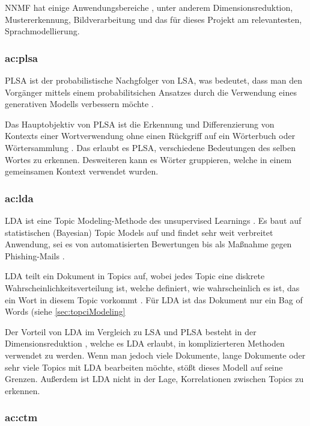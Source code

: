 NNMF hat einige Anwendungsbereiche \cite[4]{Kherwa2020}, unter anderem Dimensionsreduktion, Mustererkennung, Bildverarbeitung und das für dieses Projekt am relevantesten, Sprachmodellierung.

\subsubsection{\acrfull{ac:plsa}}

PLSA ist der probabilistische Nachgfolger von LSA, was bedeutet, dass man den Vorgänger mittels einem probabilitsichen Ansatzes durch die Verwendung eines generativen Modells verbessern möchte \cite[148]{Alghamdi2015}.

Das Hauptobjektiv von PLSA ist die Erkennung und Differenzierung von Kontexts einer Wortverwendung ohne einen Rückgriff auf ein Wörterbuch oder Wörtersammlung \cite[148]{Alghamdi2015}. Das erlaubt es PLSA, verschiedene Bedeutungen des selben Wortes zu erkennen. Desweiteren kann es Wörter gruppieren, welche in einem gemeinsamen Kontext verwendet wurden.

\subsubsection{\acrfull{ac:lda}}

LDA ist eine Topic Modeling-Methode des unsupervised Learnings \cite[149]{Alghamdi2015}. Es baut auf statistischen (Bayesian) Topic Models auf und findet sehr weit verbreitet Anwendung, sei es von automatisierten Bewertungen bis als Maßnahme gegen Phishing-Mails \cite[150]{Alghamdi2015}.

LDA teilt ein Dokument in Topics auf, wobei jedes Topic eine diskrete Wahrscheinlichkeitsverteilung ist, welche definiert, wie wahrscheinlich es ist, das ein Wort in diesem Topic vorkommt \cite[149]{Alghamdi2015}. Für LDA ist das Dokument nur ein Bag of Words (siehe \ref{sec:topciModeling}

Der Vorteil von LDA im Vergleich zu LSA und PLSA besteht in der Dimensionsreduktion \cite[175]{topicmodelsurvey_padmaja}, welche es LDA erlaubt, in komplizierteren Methoden verwendet zu werden. Wenn man jedoch viele Dokumente, lange Dokumente oder sehr viele Topics mit LDA bearbeiten möchte, stößt dieses Modell auf seine Grenzen. Außerdem ist LDA nicht in der Lage, Korrelationen zwischen Topics zu erkennen.

\subsubsection{\acrfull{ac:ctm}}

